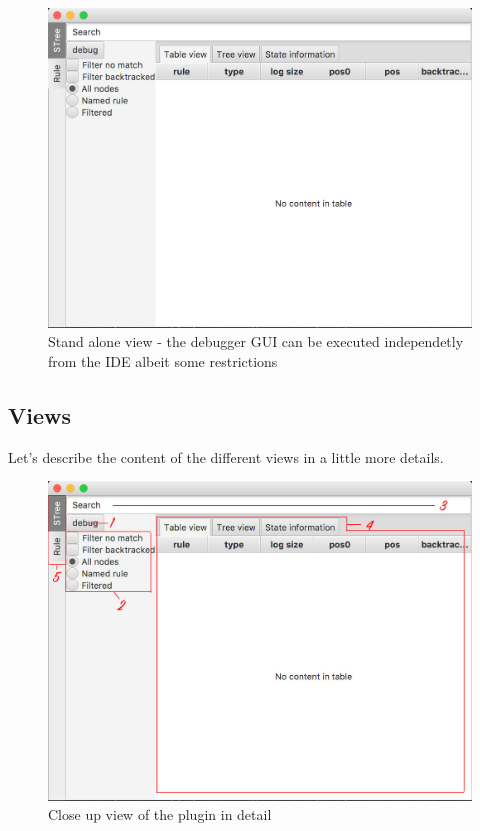 	\begin{figure}[H]
		\centering
		\includegraphics[width=.75\textwidth] {ressources/stand_alone}
		\caption{Stand alone view - the debugger GUI can be executed independetly from the IDE albeit some restrictions} 
		\label{fig:stand_alone}
	\end{figure}





	\subsection{Views}
	Let's describe the content of the different views in a little more details.

		\begin{figure}[h]
			\includegraphics[width=1\textwidth] {ressources/stand_alone_detailed}
			\caption{Close up view of the plugin in detail} 
			\label{fig:stand_alone_detailed}
		\end{figure}

